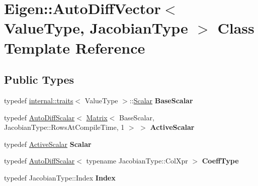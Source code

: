 \hypertarget{class_eigen_1_1_auto_diff_vector}{}\section{Eigen\+:\+:Auto\+Diff\+Vector$<$ Value\+Type, Jacobian\+Type $>$ Class Template Reference}
\label{class_eigen_1_1_auto_diff_vector}
\subsection*{Public Types}
\begin{DoxyCompactItemize}
\item 
\mbox{\label{class_eigen_1_1_auto_diff_vector_a6e773836add85ed4408d76edc11f9a44}} 
typedef \hyperlink{struct_eigen_1_1internal_1_1traits}{internal\+::traits}$<$ Value\+Type $>$\+::\hyperlink{class_eigen_1_1_auto_diff_scalar}{Scalar} {\bfseries Base\+Scalar}
\item 
\mbox{\label{class_eigen_1_1_auto_diff_vector_a048526857fa96b35452716b4da209591}} 
typedef \hyperlink{class_eigen_1_1_auto_diff_scalar}{Auto\+Diff\+Scalar}$<$ \hyperlink{group___core___module_class_eigen_1_1_matrix}{Matrix}$<$ Base\+Scalar, Jacobian\+Type\+::\+Rows\+At\+Compile\+Time, 1 $>$ $>$ {\bfseries Active\+Scalar}
\item 
\mbox{\label{class_eigen_1_1_auto_diff_vector_aece477c877459511bbaf4aab630727ea}} 
typedef \hyperlink{class_eigen_1_1_auto_diff_scalar}{Active\+Scalar} {\bfseries Scalar}
\item 
\mbox{\label{class_eigen_1_1_auto_diff_vector_a3b6605c69ba58741f7b88e91a1edf501}} 
typedef \hyperlink{class_eigen_1_1_auto_diff_scalar}{Auto\+Diff\+Scalar}$<$ typename Jacobian\+Type\+::\+Col\+Xpr $>$ {\bfseries Coeff\+Type}
\item 
\mbox{\label{class_eigen_1_1_auto_diff_vector_a49bfdebfc40fc86a3043fbbc458c667d}} 
typedef Jacobian\+Type\+::\+Index {\bfseries Index}
\item 
\mbox{\label{class_eigen_1_1_auto_diff_vector_a6e773836add85ed4408d76edc11f9a44}} 

\end{DoxyCompactItemize}
